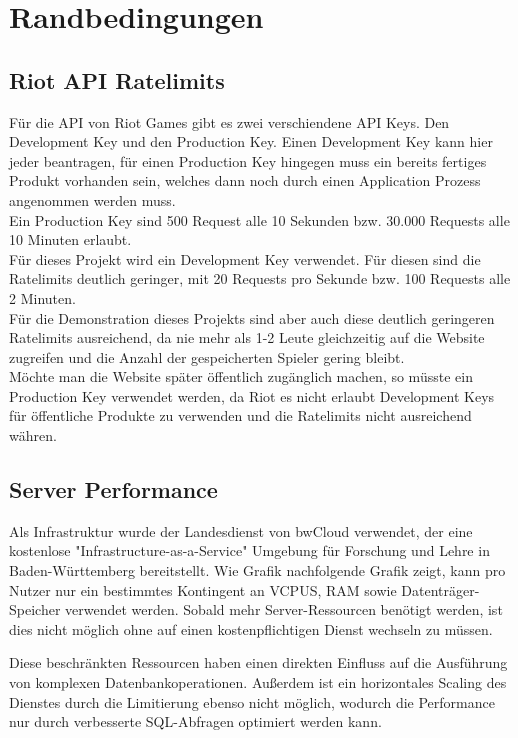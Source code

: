 \section{Randbedingungen}

\subsection{Riot API Ratelimits}\label{riot-api-ratelimits}
Für die API von Riot Games gibt es zwei verschiendene API Keys. Den Development Key und den Production Key. Einen Development Key kann hier jeder beantragen, für einen Production Key hingegen muss ein bereits fertiges Produkt vorhanden sein, welches dann noch durch einen Application Prozess angenommen werden muss.\\
Ein Production Key sind 500 Request alle 10 Sekunden bzw. 30.000 Requests alle 10 Minuten erlaubt.\\
Für dieses Projekt wird ein Development Key verwendet. Für diesen sind die Ratelimits deutlich geringer, mit 20 Requests pro Sekunde bzw. 100 Requests alle 2 Minuten.\\
Für die Demonstration dieses Projekts sind aber auch diese deutlich geringeren Ratelimits ausreichend, da nie mehr als 1-2 Leute gleichzeitig auf die Website zugreifen und die Anzahl der gespeicherten Spieler gering bleibt.\\
Möchte man die Website später öffentlich zugänglich machen, so müsste ein Production Key verwendet werden, da Riot es nicht erlaubt Development Keys für öffentliche Produkte zu verwenden und die Ratelimits nicht ausreichend währen.

\subsection{Server Performance}

Als Infrastruktur wurde der Landesdienst von bwCloud verwendet, der eine kostenlose
"Infrastructure-as-a-Service" Umgebung für Forschung und Lehre in Baden-Württemberg bereitstellt.
Wie Grafik nachfolgende Grafik zeigt, kann pro Nutzer nur ein bestimmtes Kontingent an VCPUS, RAM sowie Datenträger-Speicher verwendet werden.
Sobald mehr Server-Ressourcen benötigt werden, ist dies nicht möglich ohne auf einen kostenpflichtigen Dienst wechseln zu müssen.


Diese beschränkten Ressourcen haben einen direkten Einfluss auf die Ausführung von komplexen Datenbankoperationen. Außerdem ist ein
horizontales Scaling des Dienstes durch die Limitierung ebenso nicht möglich, wodurch die Performance nur durch verbesserte SQL-Abfragen
optimiert werden kann.
